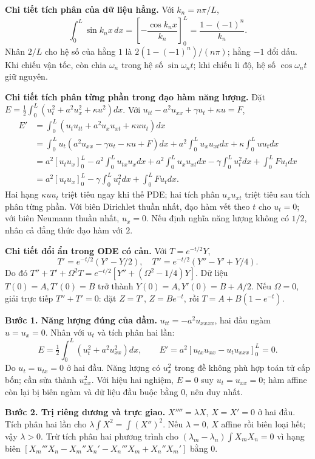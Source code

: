 \textbf{Chi tiết tích phân của dữ liệu hằng.} Với $k_n=n\pi/L$,
\[\int_0^L\sin k_nx\,dx=\left[-\frac{\cos k_nx}{k_n}\right]_0^L=\frac{1-(-1)^n}{k_n}.\]
Nhân $2/L$ cho hệ số của hằng $1$ là $2(1-(-1)^n)/(n\pi)$; hằng $-1$ đổi dấu. Khi chiếu vận tốc, còn chia $\omega_n$ trong hệ số $\sin\omega_nt$; khi chiếu li độ, hệ số $\cos\omega_nt$ giữ nguyên.

\textbf{Chi tiết tích phân từng phần trong đạo hàm năng lượng.} Đặt $E=\frac12\int_0^L(u_t^2+a^2u_x^2+\kappa u^2)dx$. Với $u_{tt}-a^2u_{xx}+\gamma u_t+\kappa u=F$,
\[\begin{aligned}
E'&=\int_0^L(u_tu_{tt}+a^2u_xu_{xt}+\kappa uu_t)dx\\
&=\int_0^Lu_t(a^2u_{xx}-\gamma u_t-\kappa u+F)dx
+a^2\int_0^Lu_xu_{xt}dx+\kappa\int_0^Luu_tdx\\
&=a^2[u_tu_x]_0^L-a^2\int_0^Lu_{tx}u_xdx
+a^2\int_0^Lu_xu_{xt}dx-\gamma\int_0^Lu_t^2dx+\int_0^LFu_tdx\\
&=a^2[u_tu_x]_0^L-\gamma\int_0^Lu_t^2dx+\int_0^LFu_tdx.
\end{aligned}\]
Hai hạng $\kappa uu_t$ triệt tiêu ngay khi thế PDE; hai tích phân $u_xu_{xt}$ triệt tiêu sau tích phân từng phần. Với biên Dirichlet thuần nhất, đạo hàm vết theo $t$ cho $u_t=0$; với biên Neumann thuần nhất, $u_x=0$. Nếu định nghĩa năng lượng không có $1/2$, nhân cả đẳng thức đạo hàm với $2$.

\textbf{Chi tiết đổi ẩn trong ODE có cản.} Với $T=e^{-t/2}Y$,
\[T'=e^{-t/2}(Y'-Y/2),\quad T''=e^{-t/2}(Y''-Y'+Y/4).\]
Do đó $T''+T'+\Omega^2T=e^{-t/2}[Y''+(\Omega^2-1/4)Y]$. Dữ liệu $T(0)=A,T'(0)=B$ trở thành $Y(0)=A,Y'(0)=B+A/2$. Nếu $\Omega=0$, giải trực tiếp $T''+T'=0$: đặt $Z=T'$, $Z=Be^{-t}$, rồi $T=A+B(1-e^{-t})$.

\textbf{Bước 1. Năng lượng đúng của dầm.} $u_{tt}=-a^2u_{xxxx}$, hai đầu ngàm $u=u_x=0$. Nhân với $u_t$ và tích phân hai lần:
\[E=\tfrac12\int_0^L(u_t^2+a^2u_{xx}^2)dx,\qquad E'=a^2[u_{tx}u_{xx}-u_tu_{xxx}]_0^L=0.\]
Do $u_t=u_{tx}=0$ ở hai đầu. Năng lượng có $u_x^2$ trong đề không phù hợp toán tử cấp bốn; cần sửa thành $u_{xx}^2$. Với hiệu hai nghiệm, $E=0$ suy $u_t=u_{xx}=0$; hàm affine còn lại bị biên ngàm và dữ liệu đầu buộc bằng $0$, nên duy nhất.

\textbf{Bước 2. Trị riêng dương và trực giao.} $X''''=\lambda X$, $X=X'=0$ ở hai đầu. Tích phân hai lần cho $\lambda\int X^2=\int(X'')^2$. Nếu $\lambda=0$, $X$ affine rồi biên loại hết; vậy $\lambda>0$. Trừ tích phân hai phương trình cho $(\lambda_m-\lambda_n)\int X_mX_n=0$ vì hạng biên $[X_m'''X_n-X_m''X_n'-X_n'''X_m+X_n''X_m']$ bằng $0$.

